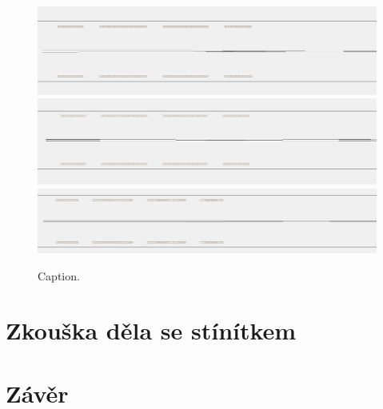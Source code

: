 \begin{figure}[htbp!]
\centering
\includegraphics[width = 366 pt]{Figure/05/1a.jpg}
\vfill
\vfill
\includegraphics[width = 366 pt]{Figure/05/1b.jpg}
\vfill
\vfill
\includegraphics[width = 366 pt]{Figure/05/1c.jpg}
\caption{Caption.}
\label{05simulaceFinalniKonfigurace}
\end{figure}

\section{Zkouška děla se stínítkem}

\section{Závěr}
